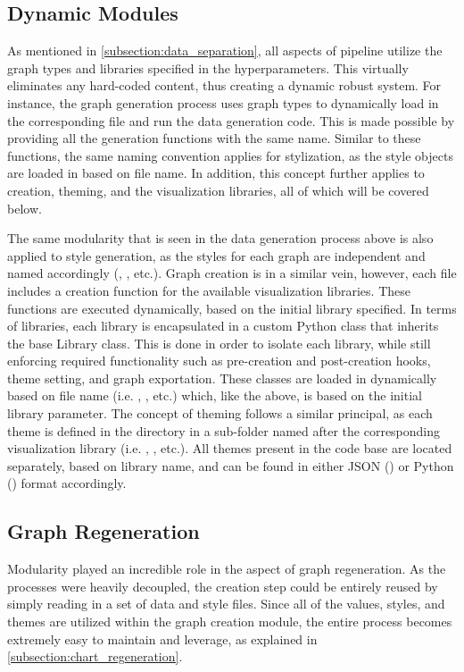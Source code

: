 \subsection{Dynamic Modules}
As mentioned in \autoref{subsection:data_separation}, all aspects of pipeline utilize the graph types and libraries specified in the hyperparameters. This virtually eliminates any hard-coded content, thus creating a dynamic robust system. For instance, the graph generation process uses graph types to dynamically load in the corresponding file and run the data generation code. This is made possible by providing all the generation functions with the same name. Similar to these functions, the same naming convention applies for stylization, as the style objects are loaded in based on file name. In addition, this concept further applies to creation, theming, and the visualization libraries, all of which will be covered below.

\hfill

The same modularity that is seen in the data generation process above is also applied to style generation, as the styles for each graph are independent and named accordingly (, , etc.). Graph creation is in a similar vein, however, each file includes a creation function for the available visualization libraries. These functions are executed dynamically, based on the initial library specified. In terms of libraries, each library is encapsulated in a custom Python class that inherits the base Library class. This is done in order to isolate each library, while still enforcing required functionality such as pre-creation and post-creation hooks, theme setting, and graph exportation. These classes are loaded in dynamically based on file name (i.e. , , etc.) which, like the above, is based on the initial library parameter. The concept of theming follows a similar principal, as each theme is defined in the  directory in a sub-folder named after the corresponding visualization library (i.e. , , etc.). All themes present in the code base are located separately, based on library name, and can be found in either JSON () or Python () format accordingly. 

\subsection{Graph Regeneration}
Modularity played an incredible role in the aspect of graph regeneration. As the processes were heavily decoupled, the creation step could be entirely reused by simply reading in a set of data and style files. Since all of the values, styles, and themes are utilized within the graph creation module, the entire process becomes extremely easy to maintain and leverage, as explained in \autoref{subsection:chart_regeneration}.

